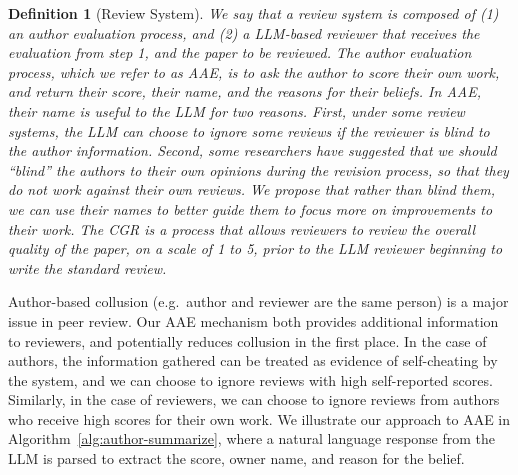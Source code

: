 \documentclass{article} %
\newtheorem{definition}{Definition}
\begin{document}
\begin{definition}[Review System] We say that a review system is composed of (1) an author evaluation process, and (2) a LLM-based reviewer that receives the evaluation from step 1, and the paper to be reviewed. The author evaluation process, which we refer to as AAE, is to ask the author to score their own work, and return their score, their name, and the reasons for their beliefs. In AAE, their name is useful to the LLM for two reasons. First, under some review systems, the LLM can choose to ignore some reviews if the reviewer is blind to the author information. Second, some researchers have suggested that we should ``blind'' the authors to their own opinions during the revision process, so that they do not work against their own reviews. We propose that rather than blind them, we can use their names to better guide them to focus more on improvements to their work. 
The CGR is a process that allows reviewers to review the overall quality of the paper, on a scale of 1 to 5, prior to the LLM reviewer beginning to write the standard review. 
\end{definition}
Author-based collusion (e.g.\ author and reviewer are the same person) is a major issue in peer review. Our AAE mechanism both provides additional information to reviewers, and potentially reduces collusion in the first place. In the case of authors, the information gathered can be treated as evidence of self-cheating by the system, and we can choose to ignore reviews with high self-reported scores. Similarly, in the case of reviewers, we can choose to ignore reviews from authors who receive high scores for their own work. We illustrate our approach to AAE in Algorithm~\ref{alg:author-summarize}, where a natural language response from the LLM is parsed to extract the score, owner name, and reason for the belief. 
\end{document}
